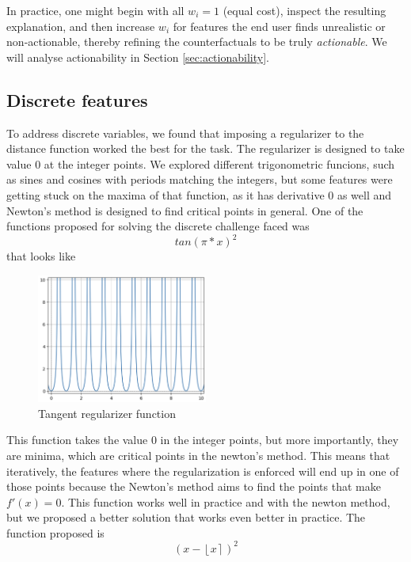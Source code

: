 \documentclass[12pt]{extarticle}
\numberwithin{equation}{section}
\begin{document}
In practice, one might begin with all $w_i = 1$ (equal cost), inspect the resulting explanation, and then increase $w_i$ for features the end user finds unrealistic or non‐actionable, thereby refining the counterfactuals to be truly \emph{actionable}. We will analyse actionability in Section \ref{sec:actionability}.

\subsection{Discrete features}\label{sec:discrete}
To address discrete variables, we found that imposing a regularizer to the distance function worked the best for the task. The regularizer is designed 
to take value 0 at the integer points. We explored different trigonometric funcions, such as sines and cosines with periods matching the integers, but some features were getting stuck on the maxima of that function, as it has derivative 0 as well and Newton's method is designed to find critical points in general. One of the functions proposed for solving the discrete challenge faced was
\begin{equation}
    tan(\pi * x)^2
\end{equation}
that looks like
\begin{figure}[H]
    \centering
    \includegraphics[width=0.5\textwidth]{images/tan_integers}
    \caption{Tangent regularizer function}
    \label{fig:reg tan}
\end{figure}
This function takes the value 0 in the integer points, but more importantly, they are minima, which are critical points in the newton's method. This means that iteratively, the features where the regularization is enforced will end up in one of those points because the Newton's method aims to find the points that make $f'(x) = 0$. This function works well in practice and with the newton method, but we proposed a better solution that works even better in practice. The function proposed is
\begin{equation}
    (x - \left\lfloor x \right\rceil )^2
\end{equation}
\end{document}
